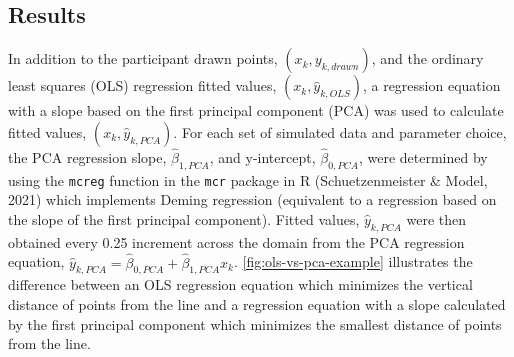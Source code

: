 \documentclass[print]{nuthesis}
\begin{document}
\hypertarget{results-1}{%
\subsection{Results}\label{results-1}}

In addition to the participant drawn points, \((x_k, y_{k,drawn})\), and the ordinary least squares (OLS) regression fitted values, \((x_k, \hat y_{k,OLS})\), a regression equation with a slope based on the first principal component (PCA) was used to calculate fitted values, \((x_k, \hat y_{k,PCA})\).
For each set of simulated data and parameter choice, the PCA regression slope, \(\hat\beta_{1,PCA}\), and y-intercept, \(\hat\beta_{0,PCA}\), were determined by using the \texttt{mcreg} function in the \texttt{mcr} package in R (Schuetzenmeister \& Model, 2021) which implements Deming regression (equivalent to a regression based on the slope of the first principal component).
Fitted values, \(\hat y_{k,PCA}\) were then obtained every 0.25 increment across the domain from the PCA regression equation, \(\hat y_{k,PCA} = \hat\beta_{0,PCA} + \hat\beta_{1,PCA} x_k\).
\cref{fig:ols-vs-pca-example} illustrates the difference between an OLS regression equation which minimizes the vertical distance of points from the line and a regression equation with a slope calculated by the first principal component which minimizes the smallest distance of points from the line.
\end{document}
